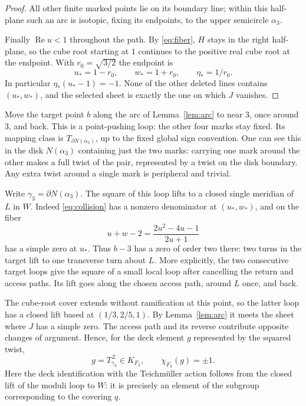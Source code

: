 \documentclass[11pt]{article}
\theoremstyle{remark}
\begin{document}
\begin{proof}
All other finite marked points lie on its boundary line; within this half-plane such an arc is isotopic, fixing its endpoints, to the upper semicircle $\alpha_3$.

Finally $\operatorname{Re}u<1$ throughout the path. By \eqref{eq:fiber}, $H$ stays in the right half-plane, so the cube root starting at $1$ continues to the positive real cube root at the endpoint. With $r_0=\sqrt{3/2}$ the endpoint is
\[
 u_*=1-r_0,\qquad w_*=1+r_0,\qquad \eta_*=1/r_0.
\]
In particular $\eta_*(u_*-1)=-1$. None of the other deleted lines contains $(u_*,w_*)$, and the selected sheet is exactly the one on which $J$ vanishes.
\end{proof}

Move the target point $b$ along the arc of Lemma~\ref{lem:arc} to near $3$, once around $3$, and back. This is a point-pushing loop: the other four marks stay fixed. Its mapping class is $T_{\partial N(\alpha_3)}$, up to the fixed global sign convention. One can see this in the disk $N(\alpha_3)$ containing just the two marks: carrying one mark around the other makes a full twist of the pair, represented by a twist on the disk boundary. Any extra twist around a single mark is peripheral and trivial.

Write $\gamma_3=\partial N(\alpha_3)$. The square of this loop lifts to a closed single meridian of $L$ in $W$. Indeed \eqref{eq:collision} has a nonzero denominator at $(u_*,w_*)$, and on the fiber
\[
 u+w-2=\frac{2u^2-4u-1}{2u+1}
\]
has a simple zero at $u_*$. Thus $b-3$ has a zero of order two there: two turns in the target lift to one transverse turn about $L$. More explicitly, the two consecutive target loops give the square of a small local loop after cancelling the return and access paths. Its lift goes along the chosen access path, around $L$ once, and back.

The cube-root cover extends without ramification at this point, so the latter loop has a closed lift based at $(1/3,2/5,1)$. By Lemma~\ref{lem:arc} it meets the sheet where $J$ has a simple zero. The access path and its reverse contribute opposite changes of argument. Hence, for the deck element $g$ represented by the squared twist,
\begin{equation}\label{eq:chi}
 g=T_{\gamma_3}^{\,2}\in K_{F_3},\qquad
 \chi_{F_3}(g)=\pm1.
\end{equation}
Here the deck identification with the Teichm\"uller action follows from the closed lift of the moduli loop to $W$: it is precisely an element of the subgroup corresponding to the covering $q$. 
\end{document}
